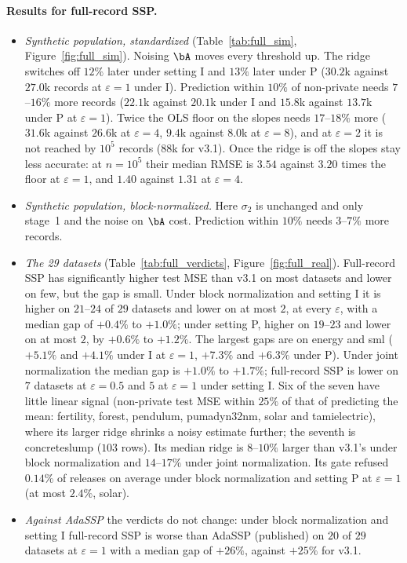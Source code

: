 \paragraph{Results for full-record SSP.}
\begin{itemize}
  \item \emph{Synthetic population, standardized} (Table~\ref{tab:full_sim}, Figure~\ref{fig:full_sim}). Noising $\bA$ moves every threshold up. The ridge switches off $12\%$ later under setting I and $13\%$ later under P ($30.2$k against $27.0$k records at $\varepsilon = 1$ under I). Prediction within $10\%$ of non-private needs $7$--$16\%$ more records ($22.1$k against $20.1$k under I and $15.8$k against $13.7$k under P at $\varepsilon = 1$). Twice the OLS floor on the slopes needs $17$--$18\%$ more ($31.6$k against $26.6$k at $\varepsilon = 4$, $9.4$k against $8.0$k at $\varepsilon = 8$), and at $\varepsilon = 2$ it is not reached by $10^5$ records ($88$k for v3.1). Once the ridge is off the slopes stay less accurate: at $n = 10^5$ their median RMSE is $3.54$ against $3.20$ times the floor at $\varepsilon = 1$, and $1.40$ against $1.31$ at $\varepsilon = 4$.
  \item \emph{Synthetic population, block-normalized.} Here $\sigma_2$ is unchanged and only stage~1 and the noise on $\bA$ cost. Prediction within $10\%$ needs $3$--$7\%$ more records.
  \item \emph{The 29 datasets} (Table~\ref{tab:full_verdicts}, Figure~\ref{fig:full_real}). Full-record SSP has significantly higher test MSE than v3.1 on most datasets and lower on few, but the gap is small. Under block normalization and setting I it is higher on $21$--$24$ of $29$ datasets and lower on at most $2$, at every $\varepsilon$, with a median gap of $+0.4\%$ to $+1.0\%$; under setting P, higher on $19$--$23$ and lower on at most $2$, by $+0.6\%$ to $+1.2\%$. The largest gaps are on energy and sml ($+5.1\%$ and $+4.1\%$ under I at $\varepsilon = 1$, $+7.3\%$ and $+6.3\%$ under P). Under joint normalization the median gap is $+1.0\%$ to $+1.7\%$; full-record SSP is lower on $7$ datasets at $\varepsilon = 0.5$ and $5$ at $\varepsilon = 1$ under setting I. Six of the seven have little linear signal (non-private test MSE within $25\%$ of that of predicting the mean: fertility, forest, pendulum, pumadyn32nm, solar and tamielectric), where its larger ridge shrinks a noisy estimate further; the seventh is concreteslump ($103$ rows). Its median ridge is $8$--$10\%$ larger than v3.1's under block normalization and $14$--$17\%$ under joint normalization. Its gate refused $0.14\%$ of releases on average under block normalization and setting P at $\varepsilon = 1$ (at most $2.4\%$, solar).
  \item \emph{Against AdaSSP} the verdicts do not change: under block normalization and setting I full-record SSP is worse than AdaSSP (published) on $20$ of $29$ datasets at $\varepsilon = 1$ with a median gap of $+26\%$, against $+25\%$ for v3.1.
\end{itemize}
